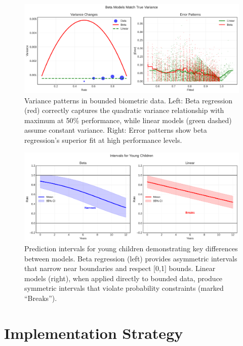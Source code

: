 \documentclass[10pt,journal,compsoc]{IEEEtran}
\begin{document}
\begin{figure}[htbp]
\centering
\includegraphics[width=\columnwidth]{variance_analysis.pdf}
\caption{Variance patterns in bounded biometric data. Left: Beta regression (red) correctly captures the quadratic variance relationship with maximum at 50\% performance, while linear models (green dashed) assume constant variance. Right: Error patterns show beta regression's superior fit at high performance levels.}
\label{fig:variance-patterns}
\end{figure}

\begin{figure}[htbp]
\centering
\includegraphics[width=\columnwidth]{prediction_intervals.pdf}
\caption{Prediction intervals for young children demonstrating key differences between models. Beta regression (left) provides asymmetric intervals that narrow near boundaries and respect [0,1] bounds. Linear models (right), when applied directly to bounded data, produce symmetric intervals that violate probability constraints (marked ``Breaks'').}
\label{fig:model-comparison}
\end{figure}

\section{Implementation Strategy}
\label{sec:implementation}
\end{document}
